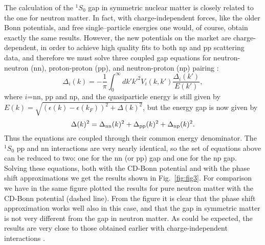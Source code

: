 \begin{multicols}{2}
The calculation of the $^1S_0$ gap in symmetric nuclear matter is  
closely related to the one for neutron matter.  In fact, with 
charge-independent forces, like the older Bonn potentials, and 
free single--particle energies one would, of course, obtain 
exactly the same results.  However, the new potentials 
on the market are charge-dependent, in order to achieve high quality fits  
to both np and pp scattering data, and therefore we must solve three 
coupled gap equations for neutron-neutron (nn), proton-proton (pp), 
and neutron-proton (np) pairing \cite{good79}:
\begin{equation}
   \Delta_i(k)=-\frac{1}{\pi}\int_0^{\infty}dk'k'^2 V_i(k,k')
   \frac{\Delta_i(k')}{E(k')},
\label{eq:eq9}
\end{equation}
where $i$=nn, pp and np, and the quasiparticle energy is still given by 
$E(k)=\sqrt{(\epsilon(k)-\epsilon(k_F))^2+\Delta(k)^2}$, but the energy 
gap is now given by 
\begin{equation}
    \Delta(k)^2=\Delta_{\rm nn}(k)^2+\Delta_{\rm pp}(k)^2+\Delta_{\rm np}(k)^2.
    \label{eq:eq10}
\end{equation}
Thus the equations are coupled through their common energy denominator.  
The $^1S_0$ pp and nn interactions are very nearly identical, so  
the set of equations above can be reduced to two: one for the nn 
(or pp) gap and one for 
the np gap.  Solving these equations, both with the CD-Bonn potential and 
with the phase shift approximations we get the results shown in Fig.\ 
\ref{fig:fig3}.  For comparison we have in the same figure plotted the 
results for pure neutron matter with the CD-Bonn potential (dashed line). 
 From the figure it is clear that the phase shift approximation works well 
also in this case, and that the gap in symmetric matter is not very different 
from the gap in neutron matter.   As could be expected, the results 
are very close to those obtained earlier with charge-independent 
interactions \cite{baldo90,chen93,tak93,elg96}. 



\end{multicols}
